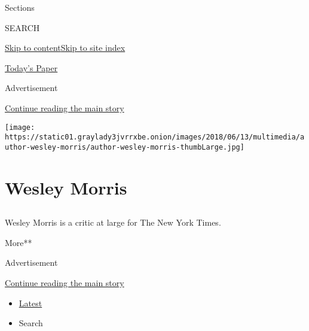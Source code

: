 Sections

SEARCH

\protect\hyperlink{site-content}{Skip to
content}\protect\hyperlink{site-index}{Skip to site index}

\href{https://myaccount.nytimes3xbfgragh.onion/auth/login?response_type=cookie\&client_id=vi}{}

\href{https://www.nytimes3xbfgragh.onion/section/todayspaper}{Today's
Paper}

Advertisement

\protect\hyperlink{after-top}{Continue reading the main story}

\texttt{[image: https://static01.graylady3jvrrxbe.onion/images/2018/06/13/multimedia/author-wesley-morris/author-wesley-morris-thumbLarge.jpg]}

\hypertarget{wesley-morris}{%
\section{Wesley Morris}\label{wesley-morris}}

\hypertarget{section}{%
\subsection{}\label{section}}

Wesley Morris is a critic at large for The New York Times.

More**

Advertisement

\protect\hyperlink{after-mid1}{Continue reading the main story}

\begin{itemize}
\tightlist
\item
  \protect\hyperlink{stream-panel}{Latest}
\item
  Search
\end{itemize}

